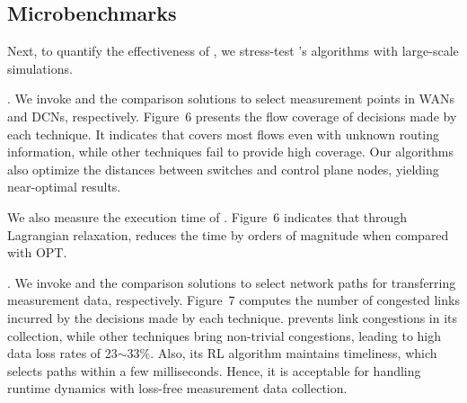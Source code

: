 
\subsection{Microbenchmarks}

Next, to quantify the effectiveness of \sysname, we stress-test \sysname's algorithms with large-scale simulations. 

. We invoke \sysname and the comparison solutions to select measurement points in WANs and DCNs, respectively. Figure~6 presents the flow coverage of decisions made by each technique. It indicates that \sysname covers most flows even with unknown routing information, while other techniques fail to provide high coverage. Our algorithms also optimize the distances between switches and control plane nodes, yielding near-optimal results. 

We also measure the execution time of \sysname. Figure~6 indicates that through Lagrangian relaxation, \sysname reduces the time by orders of magnitude when compared with OPT. 


. We invoke \sysname and the comparison solutions to select network paths for transferring measurement data, respectively. Figure~7 computes the number of congested links incurred by the decisions made by each technique. \sysname prevents link congestions in its collection, while other techniques bring non-trivial congestions, leading to high data loss rates of 23$\sim$33\%. Also, its RL algorithm maintains timeliness, which selects paths within a few milliseconds. Hence, it is acceptable for handling runtime dynamics with loss-free measurement data collection. 



